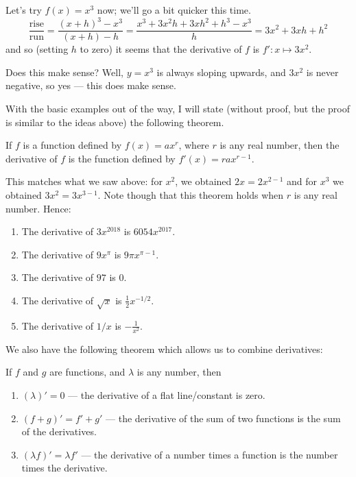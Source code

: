 \begin{ex}
  Let's try $ f(x) = x^3 $ now; we'll go a bit quicker this time.
  \begin{displaymath}
    \frac{\text{rise}}{\text{run}} = \frac{(x + h)^3 - x^3}{(x + h) - h} = \frac{x^3 + 3x^2h + 3xh^2 + h^3 - x^3}{h}
                                                                         = 3x^2 + 3xh + h^2
  \end{displaymath}
  and so (setting $ h $ to zero) it seems that the derivative of $ f $ is $ f' : x \mapsto 3x^2 $.

  Does this make sense? Well, $ y = x^3 $ is always sloping upwards, and $ 3x^2 $ is never negative, so yes --- this
  does make sense.
\end{ex}

With the basic examples out of the way, I will state (without proof, but the proof is similar to the ideas above) the following
theorem.
\begin{thm}
  If $ f $ is a function defined by $ f(x) = ax^r $, where $ r $ is any real number, then the derivative of $ f $ is the function
  defined by $ f'(x) = rax^{r - 1} $.
\end{thm}

This matches what we saw above: for $ x^2 $, we obtained $ 2x = 2x^{2 - 1} $ and for $ x^3 $ we obtained $ 3x^2 = 3x^{3 - 1} $. Note
though that this theorem holds when $ r $ is any real number. Hence:

\begin{ex}\leavevmode
  \begin{enumerate}
    \item The derivative of $ 3x^{2018} $ is $ 6054x^{2017} $.
    \item The derivative of $ 9x^\pi $ is $ 9\pi x^{\pi - 1} $.
    \item The derivative of $ 97 $ is $ 0 $.
    \item The derivative of $ \sqrt{x} $ is $ \frac{1}{2}x^{-1/2} $.
    \item The derivative of $ 1/x $ is $ -\frac{1}{x^2} $.
  \end{enumerate}
\end{ex}

\clearpage
We also have the following theorem which allows us to combine derivatives:

\begin{thm}
  If $ f $ and $ g $ are functions, and $ \lambda $ is any number, then
  \begin{enumerate}
    \item $ (\lambda)' = 0 $ --- the derivative of a flat line/constant is zero.
    \item $ (f + g)' = f' + g' $ --- the derivative of the sum of two functions is the sum of the derivatives.
    \item $ (\lambda f)' = \lambda f' $  --- the derivative of a number times a function is the number times the derivative.
  \end{enumerate}
\end{thm}


